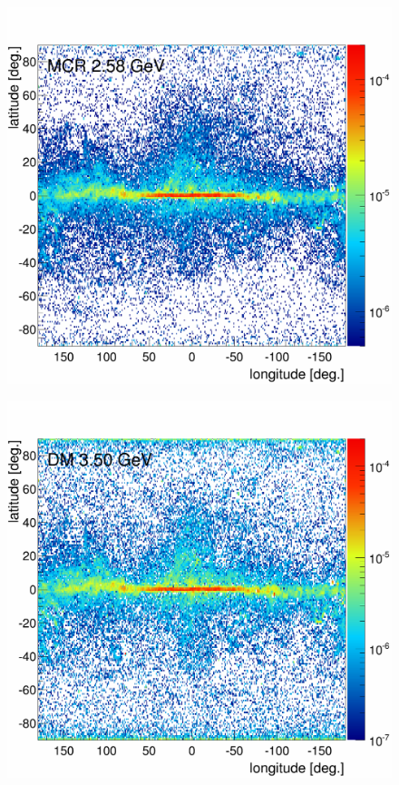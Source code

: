 \begin{figure}[H]
\begin{minipage}[h]{0.45\textwidth}
	\includegraphics[width=1.\linewidth]{pic/results/MCRonly_fine_MCR_distribution_E12.png}
  	\label{fig:MCRonly_skymap_MCR}
  \end{minipage}
  \hfill
  \begin{minipage}[h]{0.45\textwidth}
  	\centering
	\includegraphics[width=1\linewidth]{pic/results/DMonly_fine_DM_distribution_E13.png}

\end{minipage}
\end{figure}
